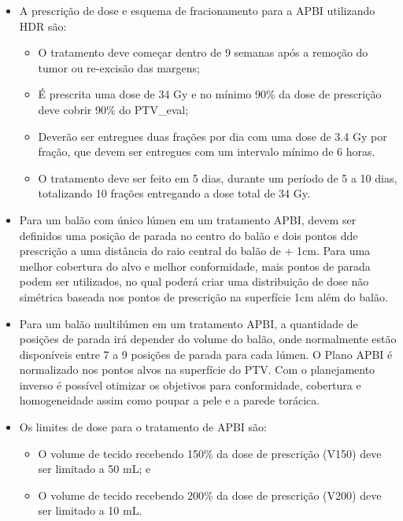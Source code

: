 \documentclass[11pt,a4paper]{article}
\newcounter{exemplo}
\begin{document}
\begin{exemplo}[Braquiterapia]
\begin{itemize}
        \item A prescrição de dose e esquema de fracionamento para a APBI utilizando HDR são:
        
            \begin{itemize}
                \item O tratamento deve começar dentro de 9 semanas após a remoção do tumor ou re-excisão das margens;
                \item É prescrita uma dose de 34 Gy e no mínimo 90\% da dose de prescrição deve cobrir 90\% do PTV\_eval;
                \item Deverão ser entregues duas frações por dia com uma dose de 3.4 Gy por fração, que devem ser entregues com um intervalo mínimo de 6 horas.
                \item O tratamento deve ser feito em 5 dias, durante um período de 5 a 10 dias, totalizando 10 frações entregando a dose total de 34 Gy.
            \end{itemize}

        \item Para um balão com único lúmen em um tratamento APBI, devem ser definidos uma posição de parada no centro do balão e dois pontos dde prescrição a uma distância do raio central do balão de + 1cm. Para uma melhor cobertura do alvo e melhor conformidade, mais pontos de parada podem ser utilizados, no qual poderá criar uma distribuição de dose não simétrica baseada nos pontos de prescrição na superfície 1cm além do balão.
        
        \item Para um balão multilúmen em um tratamento APBI, a quantidade de posições de parada irá depender do volume do balão, onde normalmente estão disponíveis entre 7 a 9 posições de parada  para cada lúmen. O Plano APBI é normalizado nos pontos alvos na superfície do PTV. Com o planejamento inverso é possível otimizar os objetivos para conformidade, cobertura e homogeneidade assim como poupar a pele e a parede torácica.
        
        \item Os limites de dose para o tratamento de APBI são:
            \begin{itemize}
                \item O volume de tecido recebendo 150\% da dose de prescrição (V150) deve ser limitado a 50 mL; e
                \item O volume de tecido recebendo 200\% da dose de prescrição (V200) deve ser limitado a 10 mL.
            \end{itemize}
        

\end{itemize}
\end{exemplo}
\end{document}
